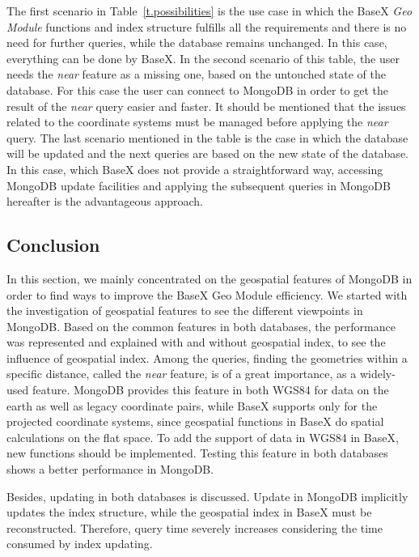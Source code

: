 \documentclass[a4paper,12pt]{article}
\begin{document}
The first scenario in Table~\ref{t.possibilities} is the use case in which the BaseX \textit{Geo Module} functions and index structure fulfills all the requirements and there is no need for further queries, while the database remains unchanged. In this case, everything can be done by BaseX. In the second scenario of this table, the user needs the \textit{near} feature as a missing one, based on the untouched state of the database. For this case the user can connect to MongoDB in order to get the result of the \textit{near} query easier and faster. It should be mentioned that the issues related to the coordinate systems must be managed before applying the \textit{near} query. The last scenario mentioned in the table is the case in which the database will be updated and the next queries are based on the new state of the database. In this case, which BaseX does not provide a straightforward way, accessing MongoDB update facilities and applying the subsequent queries in MongoDB hereafter is the advantageous approach. 

\subsection{Conclusion}
\label{conc}
In this section, we mainly concentrated on the geospatial features of MongoDB in order to find ways to improve the BaseX Geo Module efficiency. We started with the investigation of geospatial features to see the different viewpoints in MongoDB. Based on the common features in both databases, the performance was represented and explained with and without geospatial index, to see the influence of geospatial index.
Among the queries, finding the geometries within a specific distance, called the \textit{near} feature, is of a great importance, as a widely-used feature. MongoDB provides this feature in both WGS84 for data on the earth as well as legacy coordinate pairs, while BaseX supports only for the projected coordinate systems, since geospatial functions in BaseX do spatial calculations on the flat space. To add the support of data in WGS84 in BaseX, new functions should be implemented. Testing this feature in both databases shows a better performance in MongoDB. 

Besides, updating in both databases is discussed. Update in MongoDB implicitly updates the index structure, while the geospatial index in BaseX must be reconstructed. Therefore, query time severely increases considering the time consumed by index updating. 
\end{document}
